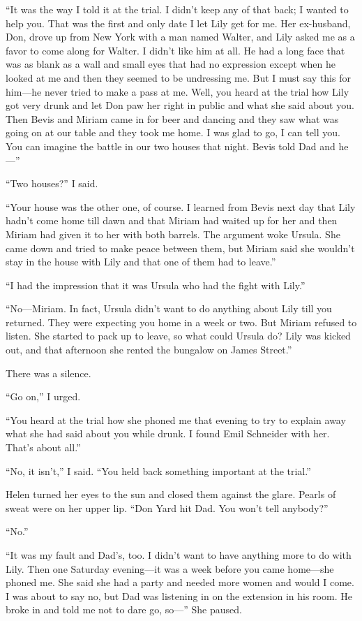 {“It was the way I told it at the trial. I didn’t keep any of that back; I wanted to help you. That was the first and only date I let Lily get for me. Her ex-husband, Don, drove up from New York with a man named Walter, and Lily asked me as a favor to come along for Walter. I didn’t like him at all. He had a long face that was as blank as a wall and small eyes that had no expression except when he looked at me and then they seemed to be undressing me. But I must say this for him—he never tried to make a pass at me. Well, you heard at the trial how Lily got very drunk and let Don paw her right in public and what she said about you. Then Bevis and Miriam came in for beer and dancing and they saw what was going on at our table and they took me home. I was glad to go, I can tell you. You can imagine the battle in our two houses that night. Bevis told Dad and he—”

“Two houses?” I said.

“Your house was the other one, of course. I learned from Bevis next day that Lily hadn’t come home till dawn and that Miriam had waited up for her and then Miriam had given it to her with both barrels. The argument woke Ursula. She came down and tried to make peace between them, but Miriam said she wouldn’t stay in the house with Lily and that one of them had to leave.”

“I had the impression that it was Ursula who had the fight with Lily.”

“No—Miriam. In fact, Ursula didn’t want to do anything about Lily till you returned. They were expecting you home in a week or two. But Miriam refused to listen. She started to pack up to leave, so what could Ursula do? Lily was kicked out, and that afternoon she rented the bungalow on James Street.”

There was a silence.

“Go on,” I urged.

“You heard at the trial how she phoned me that evening to try to explain away what she had said about you while drunk. I found Emil Schneider with her. That’s about all.”

“No, it isn’t,” I said. “You held back something important at the trial.”

Helen turned her eyes to the sun and closed them against the glare. Pearls of sweat were on her upper lip. “Don Yard hit Dad. You won’t tell anybody?”

“No.”

“It was my fault and Dad’s, too. I didn’t want to have anything more to do with Lily. Then one Saturday evening—it was a week before you came home—she phoned me. She said she had a party and needed more women and would I come. I was about to say no, but Dad was listening in on the extension in his room. He broke in and told me not to dare go, so—” She paused.

}
